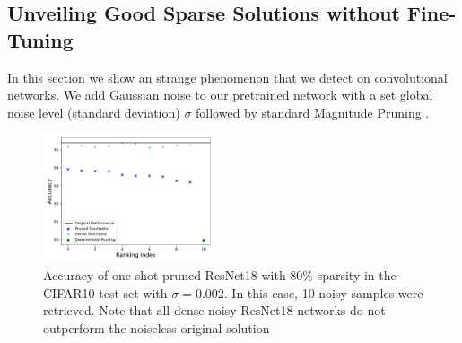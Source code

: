 
\subsection{Unveiling Good Sparse Solutions without Fine-Tuning}
In this section we show an strange phenomenon that we detect on convolutional networks.  
We add Gaussian noise to our pretrained network with a set global noise level
(standard deviation) $\sigma$ followed by standard Magnitude Pruning \cite{hanLearningBothWeights2015a,hanDeepCompressionCompressing2016a}. 
\begin{figure}
    \centering
    \includegraphics[width=0.45\textwidth]{figures/stochastic_deterministic_gaussian_sigma_0.002_pr_0.8_batchSize_512_pop_10_t_11-44_test.pdf}
    \caption{ Accuracy of one-shot pruned ResNet18 with 80\% sparsity in the CIFAR10 test set with $\sigma = 0.002$. In this case, 10 noisy samples were retrieved. Note that all dense noisy ResNet18 networks do not outperform the noiseless 
    original solution}
    \label{fig:stochastic_versus_deterministic}
\end{figure}

